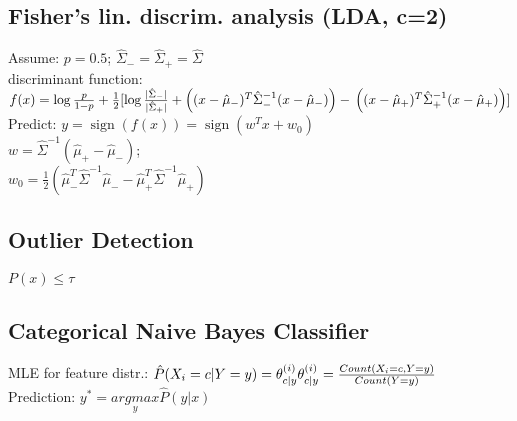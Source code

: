 \subsection*{Fisher's lin. discrim. analysis (LDA, c=2)}
Assume: $p = 0.5$; $\hat{\Sigma}_- = \hat{\Sigma}_+ = \hat{\Sigma}$\\
discriminant function: 
$f(x) = \operatorname{\log} \frac{p}{1-p} + \\
\frac{1}{2}[\operatorname{\log} \frac{|\hat{\Sigma}_-|}{|\hat{\Sigma}_+|}
+ \left((x - \hat{\mu}_-)^T \hat{\Sigma}_-^{-1} (x - \hat{\mu}_-)\right) - \\
\left((x - \hat{\mu}_+)^T \hat{\Sigma}_+^{-1} (x - \hat{\mu}_+)\right)]$\\
Predict: $y = \operatorname{sign}(f(x)) = \operatorname{sign} (w^T x + w_0)$\\
$w = \hat{\Sigma}^{-1}(\hat{\mu}_+ - \hat{\mu}_-)$; \\
$w_0 = \frac{1}{2}(\hat{\mu}_-^T\hat{\Sigma}^{-1}\hat{\mu}_- - \hat{\mu}_+^T \hat{\Sigma}^{-1}\hat{\mu}_+)$

\subsection*{Outlier Detection}
$P(x) \leq \tau$

\subsection*{Categorical Naive Bayes Classifier}
MLE for feature distr.:
$\hat{P}(X_i = c|Y = y) = \theta_{c|y}^{(i)}\\
\theta_{c|y}^{(i)} = \frac{Count(X_i = c, Y = y)}{Count(Y=y)}$\\
Prediction: $y^* = \underset{y}{argmax}\hat{P}(y|x)$